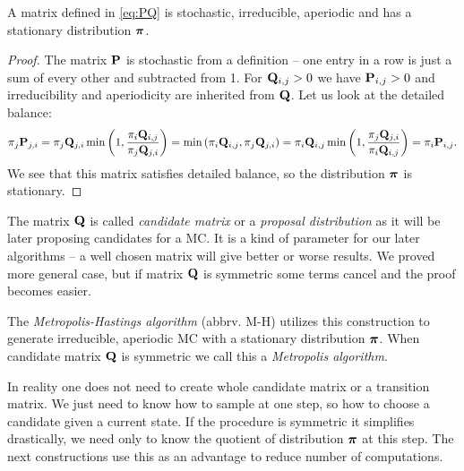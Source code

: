	\begin{theorem}
		A matrix defined in \ref{eq:PQ} is stochastic, irreducible, aperiodic and has a stationary distribution $\boldsymbol{\pi}$.
	\end{theorem}
	\begin{proof}
		The matrix $\mathbf{P}$ is stochastic from a definition -- one entry in a row is just a sum of every other and subtracted from 1. For $\mathbf{Q}_{i,j} > 0$ we have $\mathbf{P}_{i,j} > 0$ and irreducibility and aperiodicity are inherited from $\mathbf{Q}$. Let us look at the detailed balance:
		\begin{equation*}
			\pi_j \mathbf{P}_{j,i} = \pi_j \mathbf{Q}_{j,i} \min \left(1, \frac{\pi_i \mathbf{Q}_{i,j}}{\pi_j \mathbf{Q}_{j,i}}\right) = \min \left(\pi_i \mathbf{Q}_{i,j}, \pi_j \mathbf{Q}_{j,i} \right) =  \pi_i \mathbf{Q}_{i,j} \min \left(1, \frac{\pi_j \mathbf{Q}_{j,i}}{\pi_i \mathbf{Q}_{i,j}}\right) = \pi_i \mathbf{P}_{i,j}.
		\end{equation*}
		We see that this matrix satisfies detailed balance, so the distribution $\boldsymbol{\pi}$ is stationary.
	\end{proof}
	
	The matrix $\mathbf{Q}$ is called \textit{candidate matrix} or a \textit{proposal distribution} as it will be later proposing candidates for a MC. It is a kind of parameter for our later algorithms -- a well chosen matrix will give better or worse results. We proved more general case, but if matrix $\mathbf{Q}$ is symmetric some terms cancel and the proof becomes easier.
	
	The \textit{Metropolis-Hastings algorithm} (abbrv. M-H) utilizes this construction to generate irreducible, aperiodic MC with a stationary distribution $\boldsymbol{\pi}$. When candidate matrix $\mathbf{Q}$ is symmetric we call this a \textit{Metropolis algorithm}.
	
	
	
	In reality one does not need to create whole candidate matrix or a transition matrix. We just need to know how to sample at one step, so how to choose a candidate given a current state. If the procedure is symmetric it simplifies drastically, we need only to know the quotient of distribution $\boldsymbol{\pi}$ at this step. The next constructions use this as an advantage to reduce number of computations.
	